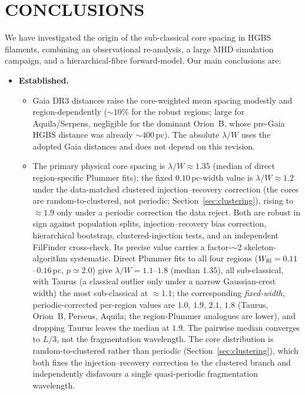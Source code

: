 \documentclass[usenatbib,twoside,twocolumn]{mnras}
\begin{document}
\section{CONCLUSIONS}

We have investigated the origin of the sub-classical core spacing in HGBS filaments, combining an observational re-analysis, a large MHD simulation campaign, and a hierarchical-fibre forward-model. Our main conclusions are:

\begin{itemize}
    \item \textbf{Established.}
    \begin{itemize}
        \item Gaia DR3 distances raise the core-weighted mean spacing modestly and region-dependently ($\sim10\%$ for the robust regions; large for Aquila/Serpens, negligible for the dominant Orion~B, whose pre-Gaia HGBS distance was already $\sim400$\,pc). The absolute $\lambda/W$ uses the adopted Gaia distances and does not depend on this revision.
        \item The primary physical core spacing is $\lambda/W\approx1.35$ (median of direct region-specific Plummer fits); the fixed $0.10$\,pc-width value is $\lambda/W\approx1.2$ under the data-matched clustered injection--recovery correction (the cores are random-to-clustered, not periodic; Section~\ref{sec:clustering}), rising to $\approx1.9$ only under a periodic correction the data reject. Both are robust in sign against population splits, injection--recovery bias correction, hierarchical bootstrap, clustered-injection tests, and an independent FilFinder cross-check. Its precise value carries a factor-$\sim$2 skeleton-algorithm systematic. Direct Plummer fits to all four regions ($W_{\rm fil}=0.11$--$0.16$\,pc, $p\simeq2.0$) give $\lambda/W=1.1$--$1.8$ (median $1.35$), all sub-classical, with Taurus (a classical outlier only under a narrow Gaussian-crest width) the most sub-classical at $\approx1.1$; the corresponding \emph{fixed-width}, periodic-corrected per-region values are $1.0$, $1.9$, $2.1$, $1.8$ (Taurus, Orion~B, Perseus, Aquila; the region-Plummer analogues are lower), and dropping Taurus leaves the median at $1.9$. The pairwise median converges to $L/3$, not the fragmentation wavelength. The core distribution is random-to-clustered rather than periodic (Section~\ref{sec:clustering}), which both fixes the injection--recovery correction to the clustered branch and independently disfavours a single quasi-periodic fragmentation wavelength.

\end{itemize}
\end{itemize}
\end{document}
